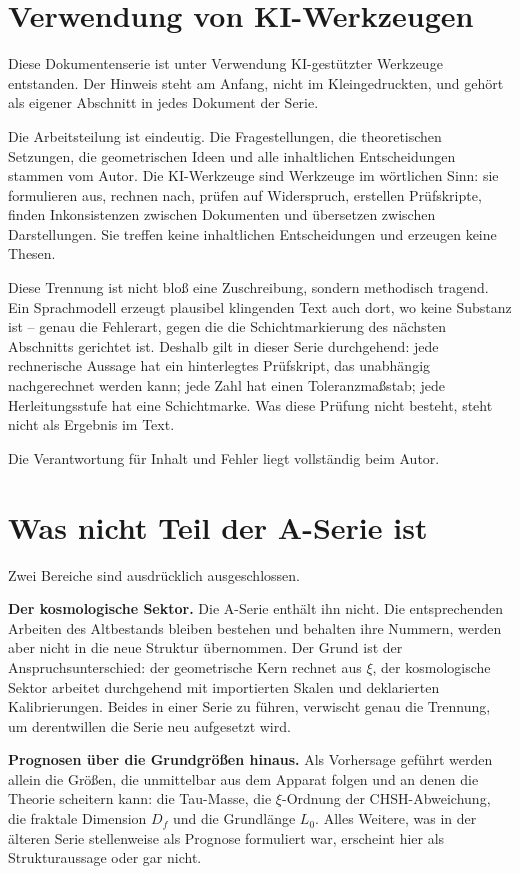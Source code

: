 \section{Verwendung von KI-Werkzeugen}

Diese Dokumentenserie ist unter Verwendung KI-gestützter Werkzeuge entstanden.
Der Hinweis steht am Anfang, nicht im Kleingedruckten, und gehört als eigener
Abschnitt in jedes Dokument der Serie.

Die Arbeitsteilung ist eindeutig. Die Fragestellungen, die theoretischen
Setzungen, die geometrischen Ideen und alle inhaltlichen Entscheidungen stammen
vom Autor. Die KI-Werkzeuge sind Werkzeuge im wörtlichen Sinn: sie formulieren
aus, rechnen nach, prüfen auf Widerspruch, erstellen Prüfskripte, finden
Inkonsistenzen zwischen Dokumenten und übersetzen zwischen Darstellungen. Sie
treffen keine inhaltlichen Entscheidungen und erzeugen keine Thesen.

Diese Trennung ist nicht bloß eine Zuschreibung, sondern methodisch tragend.
Ein Sprachmodell erzeugt plausibel klingenden Text auch dort, wo keine Substanz
ist -- genau die Fehlerart, gegen die die Schichtmarkierung des nächsten
Abschnitts gerichtet ist. Deshalb gilt in dieser Serie durchgehend: jede
rechnerische Aussage hat ein hinterlegtes Prüfskript, das unabhängig
nachgerechnet werden kann; jede Zahl hat einen Toleranzmaßstab; jede
Herleitungsstufe hat eine Schichtmarke. Was diese Prüfung nicht besteht, steht
nicht als Ergebnis im Text.

Die Verantwortung für Inhalt und Fehler liegt vollständig beim Autor.


\section{Was nicht Teil der A-Serie ist}

Zwei Bereiche sind ausdrücklich ausgeschlossen.

\textbf{Der kosmologische Sektor.} Die A-Serie enthält ihn nicht. Die
entsprechenden Arbeiten des Altbestands bleiben bestehen und behalten ihre
Nummern, werden aber nicht in die neue Struktur übernommen. Der Grund ist der
Anspruchsunterschied: der geometrische Kern rechnet aus $\xi$, der
kosmologische Sektor arbeitet durchgehend mit importierten Skalen und
deklarierten Kalibrierungen. Beides in einer Serie zu führen, verwischt genau
die Trennung, um derentwillen die Serie neu aufgesetzt wird.

\textbf{Prognosen über die Grundgrößen hinaus.} Als Vorhersage geführt werden
allein die Größen, die unmittelbar aus dem Apparat folgen und an denen die
Theorie scheitern kann: die Tau-Masse, die $\xi$-Ordnung der
CHSH-Abweichung, die fraktale Dimension $D_f$ und die Grundlänge $L_0$.
Alles Weitere, was in der älteren Serie stellenweise als Prognose formuliert
war, erscheint hier als Strukturaussage oder gar nicht.

